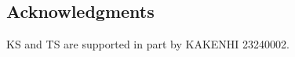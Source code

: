 \documentclass{llncs}
\begin{document}

\subsection*{Acknowledgments}
KS and TS are supported in part by KAKENHI 23240002.





\end{document}
